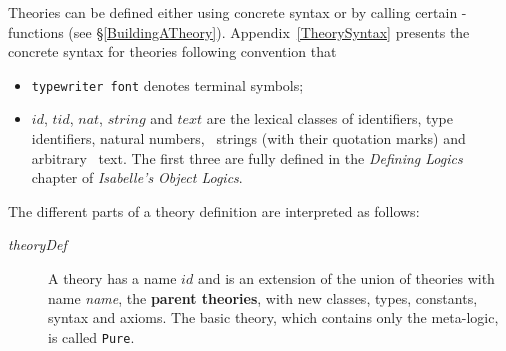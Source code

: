 Theories can be defined either using concrete syntax or by calling certain
\ML-functions (see \S\ref{BuildingATheory}).  Appendix~\ref{TheorySyntax}
presents the concrete syntax for theories following convention that
\begin{itemize}
\item {\tt typewriter font} denotes terminal symbols;
\item $id$, $tid$, $nat$, $string$ and $text$ are the lexical classes of
  identifiers, type identifiers, natural numbers, \ML\ strings (with their
  quotation marks) and arbitrary \ML\ text. The first three are fully defined
  in the {\it Defining Logics} chapter of {\it Isabelle's Object Logics}.
\end{itemize}
The different parts of a theory definition are interpreted as follows:
\begin{description} 
\item[{\it theoryDef}] A theory has a name $id$ and is an extension of the
  union of theories with name {\it name}, the {\bf parent
    theories}, with new classes, types, constants,
  syntax and axioms.  The basic theory, which contains only the meta-logic,
  is called {\tt Pure}.


\end{description}
